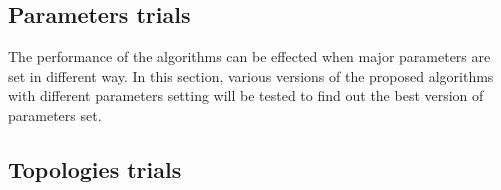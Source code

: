 \documentclass[final]{elsarticle}
\begin{document}
\subsection{Parameters trials}
The performance of the algorithms can be effected when major parameters are set in different way. In this section, various versions of the proposed algorithms with different parameters setting will be tested to find out the best version of parameters set.

\subsection{Topologies trials}
\begin{landscape}
	
\end{landscape}
\end{document}
